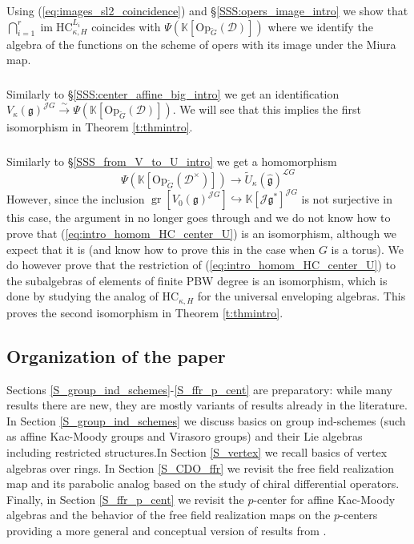 \documentclass{amsart}
\theoremstyle{definition}
\newcommand{\sss}{\subsubsection{}}
\newcommand{\D}{\sD}
\newcommand{\sD}{\mathscr{D}}
\newcommand{\on}{\mathrm}
\newcommand{\g}{\mathfrak{g}}
\newcommand{\hg}{\hat{\mathfrak{g}}}
\newcommand{\gr}{\operatorname{gr}}
\newcommand{\HC}{\mathrm{HC}} %
\newcommand{\Jet}{\mathscr{J}}
\newcommand{\Loop}{\mathscr{L}}
\newcommand{\Op}{\on{Op}}
\newcommand{\bK}{\mathbb{K}}
\renewcommand{\bK}{\mathbb{K}} %
\numberwithin{equation}{section}
\begin{document}
\sss Using (\ref{eq:images_sl2_coincidence}) and 
\S\ref{SSS:opers_image_intro} we show that 
$\bigcap_{i=1}^r \operatorname{im}\HC^{L_i}_{\kappa,H}$ coincides with $\Psi(\bK[\Op_{\check{G}}(\D)])$ where we identify the algebra of the functions on the scheme of opers with its image under the Miura map. 

\sss Similarly to \S\ref{SSS:center_affine_big_intro} we get an identification  $V_\kappa(\g)^{\Jet G} \xrightarrow{\sim}\Psi(\bK[\Op_{\check{G}}(\D)])$. We will see that this implies the first isomorphism in Theorem \ref{t:thmintro}.

\sss Similarly to \S\ref{SSS_from_V_to_U_intro} we get a homomorphism 
\begin{equation}\label{eq:intro_homom_HC_center_U}
\Psi(\bK[\Op_{\check{G}}(\D^\times)])\rightarrow \widetilde{U}_\kappa(\hg)^{\Loop G}
\end{equation}
However, since the inclusion $\gr[V_0(\g)^{\Jet G}]\hookrightarrow\bK[\Jet\g^*]^{\Jet G}$ is not surjective in this case, the argument in \cite[Sec. 4.3]{Frenkel_loop} no longer goes through and we do not know how to prove that (\ref{eq:intro_homom_HC_center_U}) is an isomorphism, although we expect that it is (and know how to prove this in the case when $G$ is a torus). We do however prove that the restriction of (\ref{eq:intro_homom_HC_center_U}) to the subalgebras of elements of finite PBW degree is an isomorphism, which is done by studying the analog of $\HC_{\kappa,H}$ for the universal enveloping algebras. This proves the second isomorphism in Theorem \ref{t:thmintro}. 










\subsection{Organization of the paper}
\label{s:orgpaper}
Sections \ref{S_group_ind_schemes}-\ref{S_ffr_p_cent} are preparatory: while many results there are new, they are mostly variants of results already in the literature. In Section \ref{S_group_ind_schemes} we discuss basics on group ind-schemes (such as affine Kac-Moody groups and Virasoro groups) and their Lie algebras including restricted structures.In Section \ref{S_vertex} we recall basics of vertex algebras over rings.
In Section \ref{S_CDO_ffr} we revisit the free field realization map and its parabolic analog based on the study of chiral differential operators. Finally, in Section 
\ref{S_ffr_p_cent} we revisit the $p$-center for affine Kac-Moody algebras and the behavior of the free field realization maps on the $p$-centers providing a more general and conceptual version of results from \cite{AW}.
\end{document}
